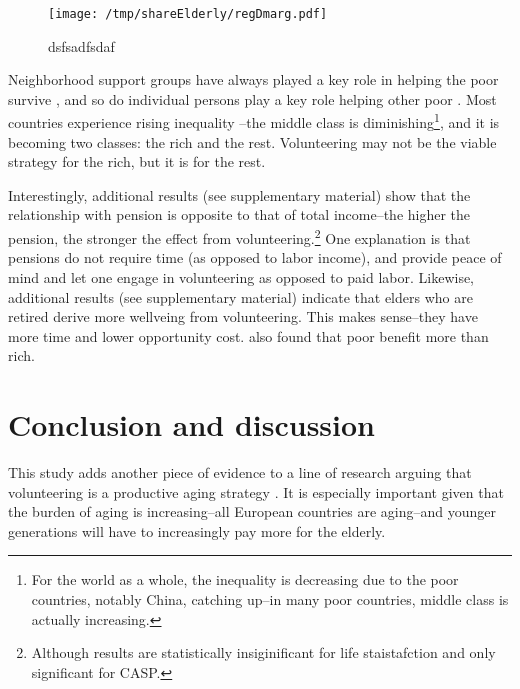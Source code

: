 \documentclass[10pt, letterpaper]{article}
\begin{document}
\begin{spacing}{1.4}
\begin{figure}[h!]
  \centering
\texttt{[image: /tmp/shareElderly/regDmarg.pdf]}  
  \caption{dsfsadfsdaf}
  \label{mar}
\end{figure}




Neighborhood support groups have always played a key role in helping the poor
survive \citep{saegert2002social}, and so do individual persons play a key role
helping other poor \citep{mazelis2017surviving}. Most countries experience
rising inequality \citep{piketty03,mackintosh13,oecd08,verbeek15}--the middle
class is diminishing\footnote{For the world as a whole, the inequality is
  decreasing due to the poor countries, notably China, catching up--in many poor
  countries, middle class is actually increasing.}, and it is becoming two classes: the rich and the
rest. Volunteering may not be the viable strategy for the rich, but it is for the rest. 


Interestingly, additional results (see supplementary material) show that the
relationship with pension is opposite to that of total income--the higher the
pension, the stronger the effect from volunteering.\footnote{Although results are
statistically insiginificant for life staistafction and only significant for CASP.} One explanation is that
pensions do not require time (as opposed to labor income), and provide peace of
mind and let one engage in volunteering as opposed to paid labor. 
Likewise, additional results (see supplementary material) indicate that elders
who are retired derive more wellveing from volunteering. This makes sense--they
have more time and lower opportunity cost. 
%
\citet{dulin2012volunteering} also found that poor benefit more than rich.

\section*{Conclusion and discussion}

This study adds another piece of evidence to a line of research arguing that
volunteering is a productive aging strategy \citep[e.g.,][]{wilson12B,hank09}.
It is especially important given that the burden of aging %
 is increasing--all European countries are aging--and younger generations will
 have to increasingly pay more for the elderly.


\end{spacing}
\end{document}
